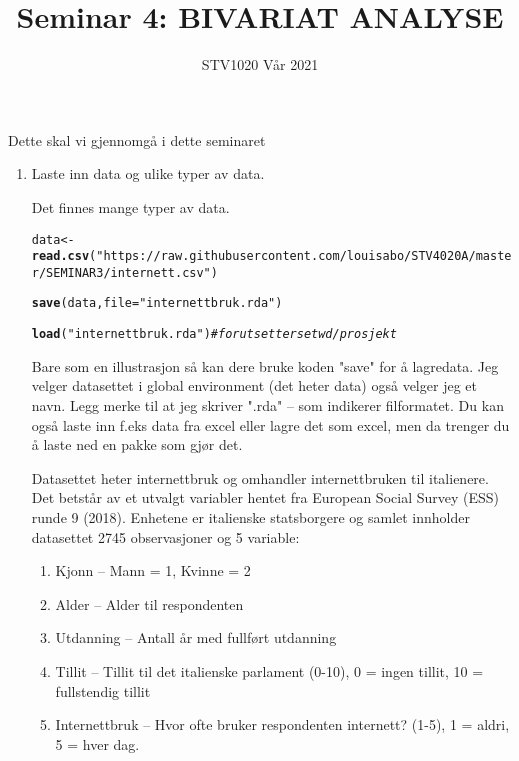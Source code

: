 \documentclass[a4 paper, 12pt]{article}\usepackage[]{graphicx}\usepackage[]{color}
\title{Seminar 4: BIVARIAT ANALYSE}
\date{STV1020 Vår 2021}
\makeatletter
\newcommand{\hlstr}[1]{\textcolor[rgb]{0.192,0.494,0.8}{#1}}%
\newcommand{\hlcom}[1]{\textcolor[rgb]{0.678,0.584,0.686}{\textit{#1}}}%
\newcommand{\hlstd}[1]{\textcolor[rgb]{0.345,0.345,0.345}{#1}}%
\newcommand{\hlkwb}[1]{\textcolor[rgb]{0.69,0.353,0.396}{#1}}%
\newcommand{\hlkwc}[1]{\textcolor[rgb]{0.333,0.667,0.333}{#1}}%
\newcommand{\hlkwd}[1]{\textcolor[rgb]{0.737,0.353,0.396}{\textbf{#1}}}%
\newenvironment{kframe}{%
 \def\at@end@of@kframe{}%
 \ifinner\ifhmode%
  \def\at@end@of@kframe{\end{minipage}}%
  \begin{minipage}{\columnwidth}%
 \fi\fi%
 \def\FrameCommand##1{\hskip\@totalleftmargin \hskip-\fboxsep
 \colorbox{shadecolor}{##1}\hskip-\fboxsep
     \hskip-\linewidth \hskip-\@totalleftmargin \hskip\columnwidth}%
 \MakeFramed {\advance\hsize-\width
   \@totalleftmargin\z@ \linewidth\hsize
   \@setminipage}}%
 {\par\unskip\endMakeFramed%
 \at@end@of@kframe}
\newenvironment{knitrout}{}{} %
\makeatother
\begin{document}
\maketitle
Dette skal vi gjennomgå i dette seminaret
\begin{enumerate}
\item Laste inn data og ulike typer av data. 

Det finnes mange typer av data. 
\begin{knitrout}
\color{fgcolor}\begin{kframe}
\begin{alltt}
  \hlstd{data} \hlkwb{<-} \hlkwd{read.csv}\hlstd{(}\hlstr{"https://raw.githubusercontent.com/louisabo/STV4020A/master/SEMINAR3/internett.csv"}\hlstd{)}

\hlkwd{save}\hlstd{(data,} \hlkwc{file} \hlstd{=} \hlstr{"internettbruk.rda"}\hlstd{)}

\hlkwd{load}\hlstd{(}\hlstr{"internettbruk.rda"}\hlstd{)} \hlcom{#forutsetter setwd/prosjekt}
\end{alltt}
\end{kframe}
\end{knitrout}

Bare som en illustrasjon så kan dere bruke koden "save" for å lagredata. Jeg velger datasettet i global environment (det heter data) også velger jeg et navn. Legg merke til at jeg skriver ".rda" -- som indikerer filformatet. Du kan også laste inn f.eks data fra excel eller lagre det som excel, men da trenger du å laste ned en pakke som gjør det.

Datasettet heter internettbruk og omhandler internettbruken til italienere. Det betstår av et utvalgt variabler hentet fra European Social Survey (ESS) runde 9 (2018). Enhetene er italienske statsborgere og samlet innholder datasettet 2745 observasjoner og 5 variable: 
\begin{enumerate}
\item Kjonn -- Mann = 1, Kvinne = 2
\item Alder -- Alder til respondenten 
\item Utdanning -- Antall år med fullført utdanning 
\item Tillit -- Tillit til det italienske parlament (0-10), 0 = ingen tillit, 10 = fullstendig tillit 
\item Internettbruk -- Hvor ofte bruker respondenten internett? (1-5), 1 = aldri, 5 = hver dag. 
\end{enumerate}


\end{enumerate}
\end{document}
